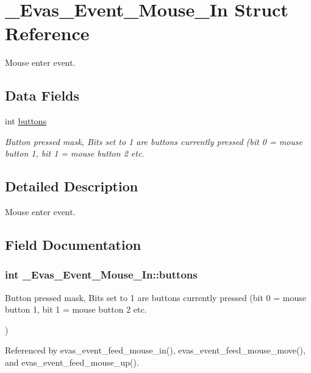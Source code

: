 \section{\_\-Evas\_\-Event\_\-Mouse\_\-In Struct Reference}
\label{struct__Evas__Event__Mouse__In}


Mouse enter event.  


\subsection*{Data Fields}
\begin{DoxyCompactItemize}
\item 
int \hyperlink{struct__Evas__Event__Mouse__In_abdd04878ea8584eb57926223bb381294}{buttons}
\begin{DoxyCompactList}\small\item\em Button pressed mask, Bits set to 1 are buttons currently pressed (bit 0 = mouse button 1, bit 1 = mouse button 2 etc. \item\end{DoxyCompactList}\end{DoxyCompactItemize}


\subsection{Detailed Description}
Mouse enter event. 

\subsection{Field Documentation}
\subsubsection[{buttons}]{\setlength{\rightskip}{0pt plus 5cm}int {\bf \_\-Evas\_\-Event\_\-Mouse\_\-In::buttons}}\label{struct__Evas__Event__Mouse__In_abdd04878ea8584eb57926223bb381294}


Button pressed mask, Bits set to 1 are buttons currently pressed (bit 0 = mouse button 1, bit 1 = mouse button 2 etc. 

) 

Referenced by evas\_\-event\_\-feed\_\-mouse\_\-in(), evas\_\-event\_\-feed\_\-mouse\_\-move(), and evas\_\-event\_\-feed\_\-mouse\_\-up().

